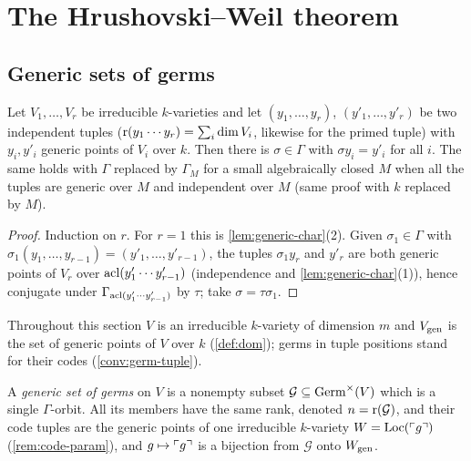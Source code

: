 \section{The Hrushovski--Weil theorem}
\label{sec:hw}

\subsection{Generic sets of germs}

\begin{lemma}\label{lem:indep-conj}
Let $V_1,\dots,V_r$ be irreducible $k$-varieties and let $(y_1,\dots,y_r)$,
$(y'_1,\dots,y'_r)$ be two independent tuples ($\operatorname{r}(y_1\cdots y_r)=\sum_i\dim V_i$,
likewise for the primed tuple) with $y_i,y'_i$ generic points of $V_i$ over $k$.  Then
there is $\sigma\in\Gamma$ with $\sigma y_i=y'_i$ for all $i$.  The same holds with
$\Gamma$ replaced by $\Gamma_M$ for a small algebraically closed $M$ when all the tuples
are generic over $M$ and independent over $M$ (same proof with $k$ replaced by $M$).
\end{lemma}
\begin{proof}
Induction on $r$.  For $r=1$ this is \cref{lem:generic-char}(2).  Given $\sigma_1\in\Gamma$
with $\sigma_1(y_1,\dots,y_{r-1})=(y'_1,\dots,y'_{r-1})$, the tuples $\sigma_1y_r$ and
$y'_r$ are both generic points of $V_r$ over $\operatorname{acl}(y'_1\cdots y'_{r-1})$ (independence
and \cref{lem:generic-char}(1)), hence conjugate under
$\Gamma_{\operatorname{acl}(y'_1\cdots y'_{r-1})}$ by $\tau$; take $\sigma=\tau\sigma_1$.
\end{proof}

Throughout this section $V$ is an irreducible $k$-variety of dimension $m$ and
$V_{\operatorname{gen}}$ is the set of generic points of $V$ over $k$ (\cref{def:dom}); germs in
tuple positions stand for their codes (\cref{conv:germ-tuple}).

\begin{definition}\label{def:genset}
A \emph{generic set of germs} on $V$ is a nonempty subset
$\mathcal G\subseteq\operatorname{Germ}^\times(V)$ which is a single $\Gamma$-orbit.  All its members
have the same rank, denoted $n=\operatorname{r}(\mathcal G)$, and their code tuples are the generic
points of one irreducible $k$-variety $W=\operatorname{Loc}(\ulcorner g\urcorner)$ (\cref{rem:code-param}), and
$g\mapsto\ulcorner g\urcorner$ is a bijection from $\mathcal G$ onto $W_{\operatorname{gen}}$.
\end{definition}

